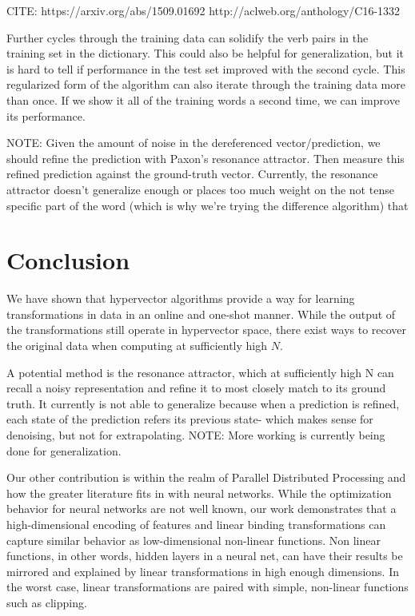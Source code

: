 \documentclass{article}
\begin{document}
CITE:
https://arxiv.org/abs/1509.01692
http://aclweb.org/anthology/C16-1332


Further cycles through the training data can solidify the verb pairs in the training set in the dictionary. This could also be helpful for generalization, but it is hard to tell if performance in the test set improved with the second cycle.  This regularized form of the algorithm can also iterate through the training data more than once. If we show it all of the training words a second time, we can improve its performance.

NOTE: Given the amount of noise in the dereferenced vector/prediction, we should refine the prediction with Paxon's resonance attractor. Then measure this refined prediction against the ground-truth vector. Currently, the resonance attractor doesn't generalize enough or places too much weight on the not tense specific part of the word (which is why we're trying the difference algorithm) that 

\section{Conclusion}
We have shown that hypervector algorithms provide a way for learning transformations in data in an online and one-shot manner. While the output of the transformations still operate in hypervector space, there exist ways to recover the original data when computing at sufficiently high $N$. 

A potential method is the resonance attractor, which at sufficiently high N can recall a noisy representation and refine it to most closely match to its ground truth. It currently is not able to generalize because when a prediction is refined, each state of the prediction refers its previous state- which makes sense for denoising, but not for extrapolating. 
NOTE: More working is currently being done for generalization. 

Our other contribution is within the realm of Parallel Distributed Processing and how the greater literature fits in with neural networks. While the optimization behavior for neural networks are not well known, our work demonstrates that a high-dimensional encoding of features and linear binding transformations can capture similar behavior as low-dimensional non-linear functions. Non linear functions, in other words, hidden layers in a neural net, can have their results be mirrored and explained by linear transformations in high enough dimensions. In the worst case, linear transformations are paired with simple, non-linear functions such as clipping. 
\end{document}
